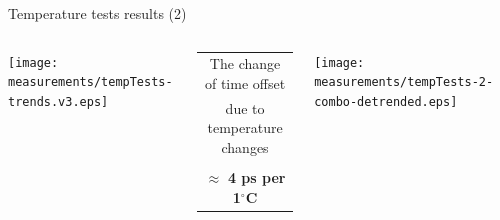 \documentclass[compress,red]{beamer}
\begin{document}
\begin{frame}{Temperature tests results (2)}


  \begin{columns}[c]
		\hspace{-1.0cm}
		\begin{center}
		\texttt{[image: measurements/tempTests-trends.v3.eps]}
		\end{center}

		\begin{center}
		  \begin{table}[!t] \footnotesize 
		  \begin{tabular}{ c  c }    
		  \multicolumn{2}{c}{ The change of time offset }       \\      
		  \multicolumn{2}{c}{ due to temperature changes}       \\    
		  \multicolumn{2}{c}{}       \\  
		  \multicolumn{2}{c}{ $\approx$ \textbf{4 ps per 1}$^{\circ}$\textbf{C}  }       \\  
		  \end{tabular}
		  \end{table}   		
		\end{center}

		\hspace{-0.8cm}
		\begin{center}
		\texttt{[image: measurements/tempTests-2-combo-detrended.eps]}
		\end{center}



\end{columns}
\end{frame}
\end{document}
